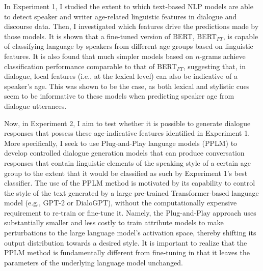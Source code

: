 In Experiment 1, I studied the extent to which text-based NLP models are able to detect speaker and writer age-related linguistic features in dialogue and discourse data. Then, I investigated which features drive the predictions made by those models. It is shown that a fine-tuned version of BERT, BERT$_{FT}$, is capable of classifying language by speakers from different age groups based on linguistic features. It is also found that much simpler models based on $n$-grams achieve classification performance comparable to that of BERT$_{FT}$, suggesting that, in dialogue, local features (i.e., at the lexical level) can also be indicative of a speaker's age. This was shown to be the case, as both lexical and stylistic cues seem to be informative to these models when predicting speaker age from dialogue utterances.

Now, in Experiment 2, I aim to test whether it is possible to generate dialogue responses that possess these age-indicative features identified in Experiment 1. 
More specifically, I seek to use Plug-and-Play language models (PPLM) \citep{dathathri2019plug} to develop controlled dialogue generation models that can produce conversation responses that contain linguistic elements of the speaking style of a certain age group to the extent that it would be classified as such by Experiment 1's best classifier. The use of the PPLM method is motivated by its capability to control the style of the text generated by a large pre-trained Transformer-based language model (e.g., GPT-2 or DialoGPT), without the computationally expensive requirement to re-train or fine-tune it. Namely, the Plug-and-Play approach uses substantially smaller and less costly to train attribute models to make perturbations to the large language model's activation space, thereby shifting its output distribution towards a desired style. It is important to realize that the PPLM method is fundamentally different from fine-tuning in that it leaves the parameters of the underlying language model unchanged.

